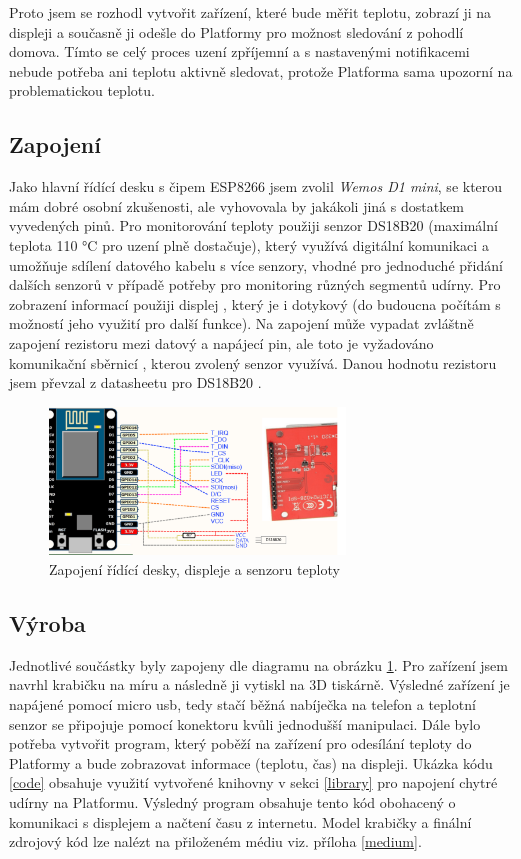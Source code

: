 Proto jsem se rozhodl vytvořit zařízení, které bude měřit teplotu, zobrazí ji na displeji a současně ji odešle do Platformy pro možnost sledování z pohodlí domova. Tímto se celý proces uzení zpříjemní a s nastavenými notifikacemi nebude potřeba ani teplotu aktivně sledovat, protože Platforma sama upozorní na problematickou teplotu.

\subsection{Zapojení} %
Jako hlavní řídící desku s čipem ESP8266 jsem zvolil \textit{Wemos D1 mini}, se kterou mám dobré osobní zkušenosti, ale vyhovovala by jakákoli jiná s dostatkem vyvedených pinů. Pro monitorování teploty použiji senzor DS18B20 (maximální teplota 110 °C pro uzení plně dostačuje), který využívá digitální komunikaci a umožňuje sdílení datového kabelu s více senzory, vhodné pro jednoduché přidání dalších senzorů v případě potřeby pro monitoring různých segmentů udírny. Pro zobrazení informací použiji displej , který je i dotykový (do budoucna počítám s možností jeho využití pro další funkce). Na zapojení může vypadat zvláštně zapojení rezistoru mezi datový a napájecí pin, ale toto je vyžadováno komunikační sběrnicí  \cite{1-wire}, kterou zvolený senzor využívá. Danou hodnotu rezistoru jsem převzal z datasheetu pro DS18B20 \cite{1-wire-ds}.

\begin{figure}[htbp]
    \centering
    \includegraphics[width=0.7\textwidth]{img/wiring.pdf}
    \caption{\label{img-wiring}Zapojení řídící desky, displeje a senzoru teploty \cite{esp-wiring}}
\end{figure}

\subsection{Výroba} %
Jednotlivé součástky byly zapojeny dle diagramu na obrázku \ref{img-wiring}. Pro zařízení jsem navrhl krabičku na míru a následně ji vytiskl na 3D tiskárně. Výsledné zařízení je napájené pomocí micro usb, tedy stačí běžná nabíječka na telefon a teplotní senzor se připojuje pomocí konektoru kvůli jednodušší manipulaci. Dále bylo potřeba vytvořit program, který poběží na zařízení pro odesílání teploty do Platformy a bude zobrazovat informace (teplotu, čas) na displeji. Ukázka kódu \ref{code} obsahuje využití vytvořené knihovny v sekci \ref{library} pro napojení chytré udírny na Platformu. Výsledný program obsahuje tento kód obohacený o komunikaci s displejem a načtení času z internetu. Model krabičky a finální zdrojový kód lze nalézt na přiloženém médiu viz. příloha \ref{medium}.

